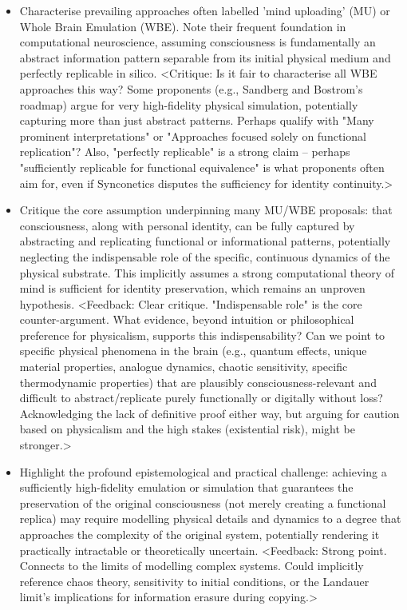 \documentclass[10pt]{article}
\begin{document}
\begin{sloppypar}
  \begin{itemize}
    \item Characterise prevailing approaches often labelled 'mind uploading' (MU) or Whole Brain Emulation (WBE). Note their frequent foundation in computational neuroscience, assuming consciousness is fundamentally an abstract information pattern separable from its initial physical medium and perfectly replicable in silico. <Critique: Is it fair to characterise all WBE approaches this way? Some proponents (e.g., Sandberg and Bostrom's roadmap) argue for very high-fidelity physical simulation, potentially capturing more than just abstract patterns. Perhaps qualify with "Many prominent interpretations" or "Approaches focused solely on functional replication"? Also, "perfectly replicable" is a strong claim – perhaps "sufficiently replicable for functional equivalence" is what proponents often aim for, even if Synconetics disputes the sufficiency for identity continuity.>

    \item Critique the core assumption underpinning many MU/WBE proposals: that consciousness, along with personal identity, can be fully captured by abstracting and replicating functional or informational patterns, potentially neglecting the indispensable role of the specific, continuous dynamics of the physical substrate. This implicitly assumes a strong computational theory of mind is sufficient for identity preservation, which remains an unproven hypothesis. <Feedback: Clear critique. "Indispensable role" is the core counter-argument. What evidence, beyond intuition or philosophical preference for physicalism, supports this indispensability? Can we point to specific physical phenomena in the brain (e.g., quantum effects, unique material properties, analogue dynamics, chaotic sensitivity, specific thermodynamic properties) that are plausibly consciousness-relevant and difficult to abstract/replicate purely functionally or digitally without loss? Acknowledging the lack of definitive proof either way, but arguing for caution based on physicalism and the high stakes (existential risk), might be stronger.>

    \item Highlight the profound epistemological and practical challenge: achieving a sufficiently high-fidelity emulation or simulation that guarantees the preservation of the original consciousness (not merely creating a functional replica) may require modelling physical details and dynamics to a degree that approaches the complexity of the original system, potentially rendering it practically intractable or theoretically uncertain. <Feedback: Strong point. Connects to the limits of modelling complex systems. Could implicitly reference chaos theory, sensitivity to initial conditions, or the Landauer limit's implications for information erasure during copying.>


\end{itemize}
\end{sloppypar}
\end{document}
